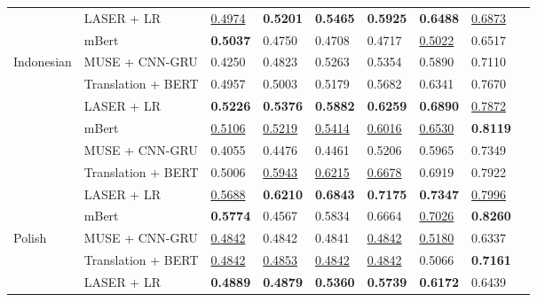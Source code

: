 \documentclass[runningheads]{llncs}
\begin{document}
\begin{table}[!tb]
{\begin{tabular}{lllllllll}
                            & LASER + LR             &\underline{0.4974}    &\textbf{0.5201}    &\textbf{0.5465}    &\textbf{0.5925}     &\textbf{0.6488}     &\underline{0.6873}        \\
                            & mBert                  &\textbf{0.5037}    &0.4750    &0.4708    &0.4717     &\underline{0.5022}     &0.6517              \\ \midrule
\multirow{5}{*}{Indonesian} & MUSE + CNN-GRU        &0.4250    &0.4823    &0.5263    &0.5354     &0.5890     &0.7110               \\
                            & Translation + BERT    &0.4957    &0.5003    &0.5179    &0.5682     &0.6341     &0.7670               \\
                            & LASER + LR             &\textbf{0.5226}    &\textbf{0.5376}    &\textbf{0.5882}    &\textbf{0.6259}     &\textbf{0.6890}     &\underline{0.7872}\\
                            & mBert                  & \underline{0.5106} & \underline{0.5219} &\underline{0.5414}  & \underline{0.6016}  & \underline{0.6530}  & \textbf{0.8119}              \\ \midrule
\multirow{5}{*}{Italian}    & MUSE + CNN-GRU        &0.4055    &0.4476    &0.4461    &0.5206     &0.5965     &0.7349               \\
                            & Translation + BERT    &0.5006    &\underline{0.5943}    &\underline{0.6215}    &\underline{0.6678}     &0.6919     &0.7922               \\
                            & LASER + LR             &\underline{0.5688}    &\textbf{0.6210}    &\textbf{0.6843}    &\textbf{0.7175}     &\textbf{0.7347}     &\underline{0.7996}        \\
                            & mBert                  & \textbf{0.5774} & 0.4567 & 0.5834 & 0.6664  & \underline{0.7026}  & \textbf{0.8260}              \\ \midrule
\multirow{5}{*}{Polish}     & MUSE + CNN-GRU        &\underline{0.4842}    &0.4842    &0.4841    &\underline{0.4842}     &\underline{0.5180}     &0.6337               \\
                            & Translation + BERT    &\underline{0.4842}    &\underline{0.4853}    &\underline{0.4842}    &\underline{0.4842}     &0.5066     &\textbf{0.7161}               \\
                            & LASER + LR             &\textbf{0.4889}    &\textbf{0.4879}    &\textbf{0.5360}    &\textbf{0.5739}     &\textbf{0.6172}     &0.6439\\

\end{tabular}}
\end{table}
\end{document}
